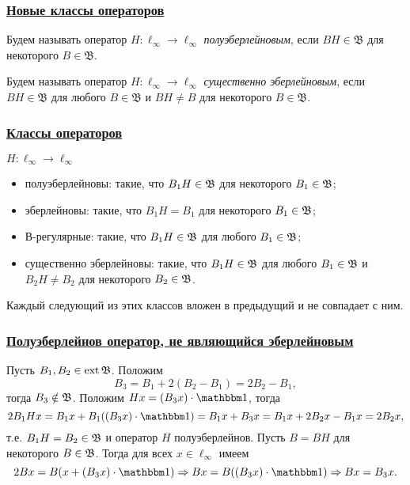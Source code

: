 \begin{frame}\frametitle{\underline{Новые классы операторов}}
	\vfill
	\begin{ddefinition}
		Будем называть оператор $H:\ell_\infty \to \ell_\infty$ \emph{полуэберлейновым}, если $BH\in\mathfrak B$ для некоторого $B\in\mathfrak B$.
	\end{ddefinition}
	\vfill
	\begin{ddefinition}
		Будем называть оператор $H:\ell_\infty \to \ell_\infty$ \emph{существенно эберлейновым}, если $BH\in\mathfrak B$ для любого $B\in\mathfrak B$ и $BH\ne B$ для некоторого $B\in\mathfrak B$.
	\end{ddefinition}
	\vfill
\end{frame}

\begin{frame}\frametitle{\underline{Классы операторов}}
	$H:\ell_\infty \to \ell_\infty$
	\begin{itemize}
		\item
			полуэберлейновы: такие, что $B_1 H \in\mathfrak{B}$ для некоторого $B_1\in \mathfrak{B}$;
		\item
			эберлейновы: такие, что $B_1 H = B_1$ для некоторого $B_1\in \mathfrak{B}$;
		\item
			В-регулярные: такие, что $B_1 H \in \mathfrak{B}$ для любого   $B_1\in \mathfrak{B}$;
		\item
			существенно эберлейновы: такие, что $B_1 H \in \mathfrak{B}$ для любого $B_1\in \mathfrak{B}$ и $B_2 H \ne B_2$ для некоторого $B_2\in \mathfrak{B}$.
	\end{itemize}
	\begin{ttheorem}
		Каждый следующий из этих классов вложен в предыдущий и не совпадает с ним.
	\end{ttheorem}
\end{frame}


\begin{frame}\frametitle{\underline{Полуэберлейнов оператор, не являющийся эберлейновым}}
	Пусть $B_1, B_2 \in \operatorname{ext} \mathfrak{B}$.
	Положим
	\begin{equation}
		\label{eq:am_not_eber_def}
		B_3 = B_1 + 2(B_2-B_1) = 2B_2-B_1,
	\end{equation}
	тогда $B_3 \notin \mathfrak{B}$.
	Положим $Hx = (B_3 x) \cdot\one$, тогда
	\begin{equation}
		2 B_1 H x = B_1 x + B_1 ((B_3 x) \cdot\one) = B_1 x + B_3 x =
		B_1 x + 2 B_2 x - B_1 x = 2B_2 x
		,
	\end{equation}
	т.е. $B_1 H = B_2 \in \mathfrak{B}$ и оператор $H$ полуэберлейнов.
	Пусть $B = BH$ для некоторого $B\in\mathfrak{B}$.
	Тогда для всех $x\in\ell_\infty$ имеем
	\begin{equation}
		2Bx = B (x + (B_3 x) \cdot \one)
		\Rightarrow
		Bx =  B((B_3 x) \cdot \one)
		\Rightarrow
		Bx = B_3x
		.
	\end{equation}
\end{frame}

